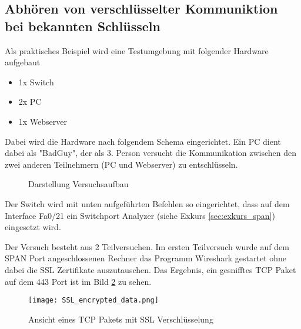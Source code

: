 	\subsection{Abhören von verschlüsselter Kommuniktion bei bekannten Schlüsseln}
	Als praktisches Beispiel wird eine Testumgebung mit folgender Hardware aufgebaut
	\begin{itemize}
		\item 1x Switch
		\item 2x PC
		\item 1x Webserver
	\end{itemize}
	Dabei wird die Hardware nach folgendem Schema eingerichtet. Ein PC dient dabei als "BadGuy", der als 3. Person versucht
	die Kommunikation zwischen den zwei anderen Teilnehmern (PC und Webserver) zu entschlüsseln.
	\begin{figure}[H]
		\centering
		\caption{Darstellung Versuchsaufbau}
		\label{fig:versuchsaufbau}
	\end{figure}
	Der Switch wird mit unten aufgeführten Befehlen so eingerichtet, dass auf dem Interface Fa0/21 ein Switchport Analyzer (siehe Exkurs \ref{sec:exkurs_span}) eingesetzt wird.
	
	Der Versuch besteht aus 2 Teilversuchen. Im ersten Teilversuch wurde auf dem SPAN Port angeschlossenen Rechner das Programm Wireshark gestartet ohne dabei die SSL Zertifikate auszutauschen. Das Ergebnis, ein gesnifftes TCP Paket auf dem 443 Port ist im Bild \ref{fig:ssl_encrypted_data} zu sehen.
	\begin{figure}[H]
		\centering
		\texttt{[image: SSL\_encrypted\_data.png]}
		\caption{Ansicht eines TCP Pakets mit SSL Verschlüsselung}
		\label{fig:ssl_encrypted_data}
	\end{figure}
	
